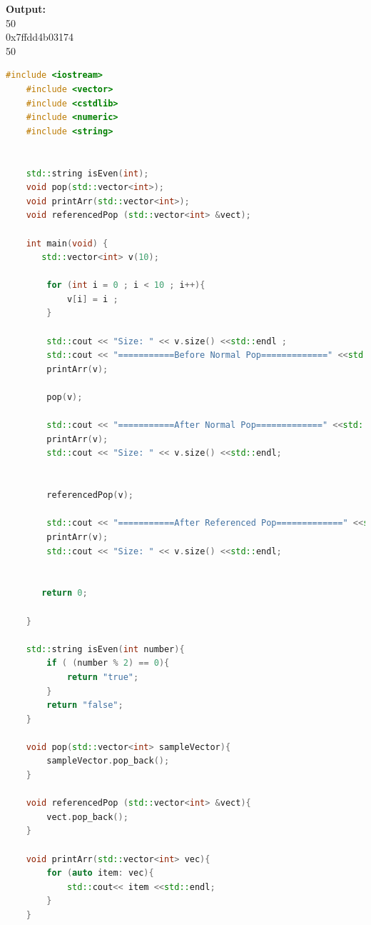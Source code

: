 \documentclass[12pt , a4paper]{article}
\begin{document}
	\begin{tcolorbox}
	\textbf{Output:}\\
	50\\
	0x7ffdd4b03174\\
	50
	\end{tcolorbox}
	\begin{lstlisting}[language=C++]
	#include <iostream>
	#include <vector>
	#include <cstdlib>
	#include <numeric>
	#include <string>
	
	
	std::string isEven(int);
	void pop(std::vector<int>);
	void printArr(std::vector<int>);
	void referencedPop (std::vector<int> &vect);
	
	int main(void) {
	   std::vector<int> v(10);
	
	    for (int i = 0 ; i < 10 ; i++){
	        v[i] = i ;
	    }
	
	    std::cout << "Size: " << v.size() <<std::endl ;
	    std::cout << "===========Before Normal Pop=============" <<std::endl ;
	    printArr(v);
	
	    pop(v);
	
	    std::cout << "===========After Normal Pop=============" <<std::endl ;
	    printArr(v);
	    std::cout << "Size: " << v.size() <<std::endl;
	
	
	    referencedPop(v);
	
	    std::cout << "===========After Referenced Pop=============" <<std::endl ;
	    printArr(v);
	    std::cout << "Size: " << v.size() <<std::endl;
	
	
	   return 0;
	
	}
	
	std::string isEven(int number){
	    if ( (number % 2) == 0){
	        return "true";
	    }
	    return "false";
	}
	
	void pop(std::vector<int> sampleVector){
	    sampleVector.pop_back();
	}
	
	void referencedPop (std::vector<int> &vect){
	    vect.pop_back();
	}
	
	void printArr(std::vector<int> vec){
	    for (auto item: vec){
	        std::cout<< item <<std::endl;
	    }
	}
	\end{lstlisting}
\end{document}
